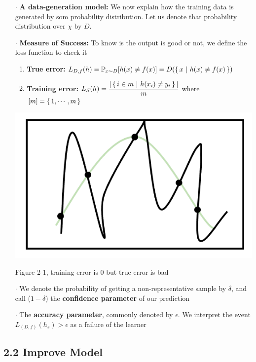 \begin{enumerate}
	\item[$\cdot$] \textbf{A data-generation model:} We now explain how the training data is generated by som probability distribution. Let us denote that probability distribution over $\chi$ by $D$.
	\item[$\cdot$] \textbf{Measure of Success:} To know is the output is good or not, we define the loss function to check it
	\begin{enumerate}
		\item \textbf{True error:} $L_{D,f}(h) = \mathbb{P}_{x\sim D}[h(x) \neq f(x)] = D(\left\{ \,x ~|~ h(x) \neq f(x) \,\right\})$
		\item \textbf{Training error:} $L_S(h) = \dfrac{|\left\{ \,i \in m ~|~ h(x_i) \neq y_i \,\right\} |}{m}$ where $[m] = \left\{ \,1,\cdots,m \,\right\}$
	\end{enumerate}
	
	\begin{center}
		\includegraphics[scale = 0.3]{./figure/2-1.png}
		
		Figure 2-1, training error is $0$ but true error is bad
	\end{center}
	
	
	\item[$\cdot$] We denote the probability of getting a non-representative sample by $\delta$, and call ($1 - \delta$) the \textbf{confidence parameter} of our prediction
	\item[$\cdot$] The \textbf{accuracy parameter}, commonly denoted by $\epsilon$. We interpret the event $L_{(D,f)}(h_s) > \epsilon$ as a failure of the learner
\end{enumerate}

\subsection*{2.2 Improve Model} $ $\\

